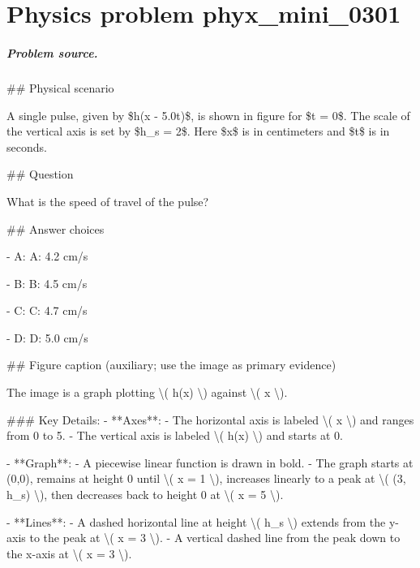 
\chapter{Physics problem phyx\_mini\_0301}
\label{ch:PhyXMiniProblems_problem_phyx_mini_0301}

\paragraph{Problem source.}
\#\# Physical scenario

A single pulse, given by \$h(x - 5.0t)\$, is shown in figure for \$t = 0\$. The scale of the vertical axis is set by \$h\_s = 2\$. Here \$x\$ is in centimeters and \$t\$ is in seconds.

\#\# Question

What is the speed of travel of the pulse?

\#\# Answer choices

- A: A: 4.2 cm/s

- B: B: 4.5 cm/s

- C: C: 4.7 cm/s

- D: D: 5.0 cm/s

\#\# Figure caption (auxiliary; use the image as primary evidence)

The image is a graph plotting \textbackslash{}( h(x) \textbackslash{}) against \textbackslash{}( x \textbackslash{}). 

\#\#\# Key Details:
- **Axes**:
  - The horizontal axis is labeled \textbackslash{}( x \textbackslash{}) and ranges from 0 to 5.
  - The vertical axis is labeled \textbackslash{}( h(x) \textbackslash{}) and starts at 0.
  
- **Graph**:
  - A piecewise linear function is drawn in bold.
  - The graph starts at (0,0), remains at height 0 until \textbackslash{}( x = 1 \textbackslash{}), increases linearly to a peak at \textbackslash{}( (3, h\_s) \textbackslash{}), then decreases back to height 0 at \textbackslash{}( x = 5 \textbackslash{}).
  
- **Lines**:
  - A dashed horizontal line at height \textbackslash{}( h\_s \textbackslash{}) extends from the y-axis to the peak at \textbackslash{}( x = 3 \textbackslash{}).
  - A vertical dashed line from the peak down to the x-axis at \textbackslash{}( x = 3 \textbackslash{}).

